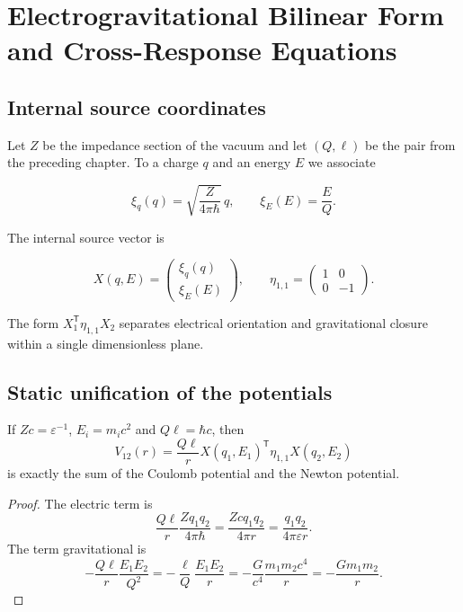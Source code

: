 \chapter{Electrogravitational Bilinear Form and Cross-Response Equations}
\label{chap:forma-electrogravitatoria}

\section{Internal source coordinates}

Let \(Z\) be the impedance section of the vacuum and let \((Q,\ell)\) be the pair
from the preceding chapter. To a charge \(q\) and an energy \(E\) we associate

\[
\xi_q(q)=\sqrt{\frac{Z}{4\pi\hbar}}\,q,
\qquad
\xi_E(E)=\frac{E}{Q}.
\]

The internal source vector is

\[
X(q,E)=
\begin{pmatrix}\xi_q(q)\\ \xi_E(E)\end{pmatrix},
\qquad
\eta_{1,1}=
\begin{pmatrix}1&0\\0&-1\end{pmatrix}.
\]

The form \(X_1^{\mathsf T}\eta_{1,1}X_2\) separates electrical orientation and
gravitational closure within a single dimensionless plane.

\section{Static unification of the potentials}

\begin{theorem}
\label{thm:rm-emg-potential}
If \(Zc=\varepsilon^{-1}\), \(E_i=m_ic^2\) and
\(Q\ell=\hbar c\), then
\begin{equation}
\boxed{
V_{12}(r)=\frac{Q\ell}{r}
X(q_1,E_1)^{\mathsf T}\eta_{1,1}X(q_2,E_2)}
\label{eq:rm-emg-potential}
\end{equation}
is exactly the sum of the Coulomb potential and the Newton potential.
\end{theorem}

\begin{proof}
The electric term is
\[
\frac{Q\ell}{r}\frac{Zq_1q_2}{4\pi\hbar}
=\frac{Zcq_1q_2}{4\pi r}
=\frac{q_1q_2}{4\pi\varepsilon r}.
\]
The term gravitational is
\[
-\frac{Q\ell}{r}\frac{E_1E_2}{Q^2}
=-\frac{\ell}{Q}\frac{E_1E_2}{r}
=-\frac{G}{c^4}\frac{m_1m_2c^4}{r}
=-\frac{Gm_1m_2}{r}.
\]
\end{proof}

